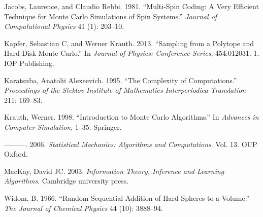 \documentclass[
  letterpaper,
  DIV=11,
  numbers=noendperiod]{scrreprt}
\newlength{\cslhangindent}
\newlength{\cslentryspacingunit} %
\newenvironment{CSLReferences}[2] %
 {%
  \setlength{\parindent}{0pt}
  \ifodd #1
  \let\oldpar\par
  \def\par{\hangindent=\cslhangindent\oldpar}
  \fi
  \setlength{\parskip}{#2\cslentryspacingunit}
 }%
 {}
\theoremstyle{definition}
\theoremstyle{remark}
\begin{document}
\hypertarget{refs}{}
\begin{CSLReferences}{1}{0}
\leavevmode{}%
Jacobs, Laurence, and Claudio Rebbi. 1981. {``Multi-Spin Coding: A Very
Efficient Technique for Monte Carlo Simulations of Spin Systems.''}
\emph{Journal of Computational Physics} 41 (1): 203--10.

\leavevmode{}%
Kapfer, Sebastian C, and Werner Krauth. 2013. {``Sampling from a
Polytope and Hard-Disk Monte Carlo.''} In \emph{Journal of Physics:
Conference Series}, 454:012031. 1. IOP Publishing.

\leavevmode{}%
Karatsuba, Anatolii Alexeevich. 1995. {``The Complexity of
Computations.''} \emph{Proceedings of the Steklov Institute of
Mathematics-Interperiodica Translation} 211: 169--83.

\leavevmode{}%
Krauth, Werner. 1998. {``Introduction to Monte Carlo Algorithms.''} In
\emph{Advances in Computer Simulation}, 1--35. Springer.

\leavevmode{}%
---------. 2006. \emph{Statistical Mechanics: Algorithms and
Computations}. Vol. 13. OUP Oxford.

\leavevmode{}%
MacKay, David JC. 2003. \emph{Information Theory, Inference and Learning
Algorithms}. Cambridge university press.

\leavevmode{}%
Widom, B. 1966. {``Random Sequential Addition of Hard Spheres to a
Volume.''} \emph{The Journal of Chemical Physics} 44 (10): 3888--94.

\end{CSLReferences}
\end{document}
